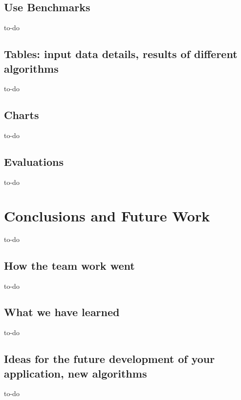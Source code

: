 \documentclass[a4paper,12pt]{article}
\begin{document}
\subsection{Use Benchmarks}
to-do
\subsection{Tables: input data details, results of different algorithms}
to-do
\subsection{Charts}
to-do
\subsection{Evaluations}
to-do

\section{Conclusions and Future Work}
to-do
\subsection{How the team work went}
to-do
\subsection{What we have learned}
to-do
\subsection{Ideas for the future development of your application, new algorithms}
to-do


\end{document}
